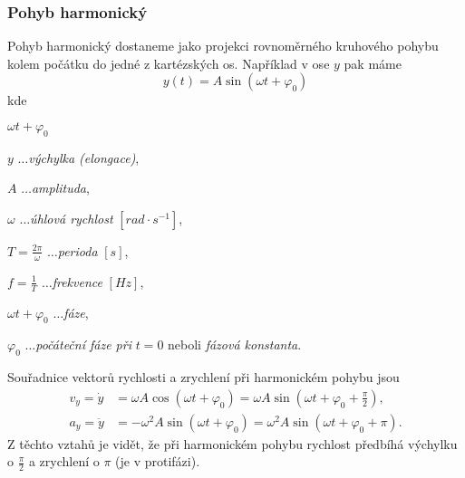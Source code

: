       \subsubsection{Pohyb harmonický}
        Pohyb harmonický dostaneme jako projekci rovnoměrného kruhového pohybu kolem počátku do
        jedné z kartézských os. Například v ose $y$ pak máme
        \begin{equation}\label{mech:eq_p_harmon}
          y(t)=A\sin(\omega t+\varphi_0)
        \end{equation}
        kde 
        \begin{labeling}{$\omega t+\varphi_0$}
          \setlength{\itemindent}{2cm}
          \item[\(y\)]                     \(\ldots\)\emph{výchylka (elongace)}, 
          \item[\(A\)]                     \(\ldots\)\emph{amplituda}, 
          \item[\(\omega\)]                \(\ldots\)\emph{úhlová rychlost} $[rad\cdot s^{-1}]$,
          \item[\(T=\frac{2\pi}{\omega}\)] \(\ldots\)\emph{perioda} $[s]$, 
          \item[\(f=\frac{1}{T}\)]         \(\ldots\)\emph{frekvence} $[Hz]$, 
          \item[\(\omega t+\varphi_0\)]    \(\ldots\)\emph{fáze}, 
          \item[\(\varphi_0\)]             \(\ldots\)\emph{počáteční fáze při} $t=0$ neboli
                                                     \emph{fázová konstanta}.
        \end{labeling}
  
        Souřadnice vektorů rychlosti a zrychlení při harmonickém pohybu jsou
        \begin{subequations}
          \label{mech:eq_harm} 
          \begin{align}
            v_y = \dot{y} 
              & = \omega A\cos(\omega t+\varphi_0 )=
                  \omega A\sin(\omega t+\varphi_0+\frac{\pi}{2}), \label{mech:eq_harm_vy}         \\
             a_y = \ddot{y} 
              &= -\omega^2A\sin(\omega t+\varphi_0 )=
                  \omega^2A\sin(\omega t+\varphi_0+\pi).          \label{mech:eq_harm_ay}
          \end{align}
        \end{subequations}  
        Z těchto vztahů je vidět, že při harmonickém pohybu rychlost předbíhá výchylku o
        $\frac{\pi}{2}$ a zrychlení o $\pi$ (je v protifázi).


